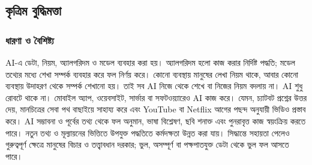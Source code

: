 \begin{topicbody}
\subsection{কৃত্রিম বুদ্ধিমত্তা}
\label{sec:ch1-ai}
\subsubsection{ধারণা ও বৈশিষ্ট্য}
AI-এ ডেটা, নিয়ম, অ্যালগরিদম ও মডেল ব্যবহার করা হয়। অ্যালগরিদম হলো কাজ করার নির্দিষ্ট পদ্ধতি; মডেল তথ্যের মধ্যে শেখা সম্পর্ক ব্যবহার করে ফল নির্ণয় করে। কোনো ব্যবস্থায় মানুষের লেখা নিয়ম থাকে, আবার কোনো ব্যবস্থায় উদাহরণ থেকে সম্পর্ক শেখানো হয়। তাই সব AI নিজে থেকে শেখে বা নিজের নিয়ম বদলায় না।
AI শুধু রোবটে থাকে না। মোবাইল অ্যাপ, ওয়েবসাইট, সার্ভার বা সফটওয়্যারেও AI কাজ করে। যেমন, চ্যাটবট প্রশ্নের উত্তর দেয়, মানচিত্রের সেবা পথ বাছাইয়ে সাহায্য করে এবং YouTube বা Netflix আগের পছন্দ অনুযায়ী ভিডিও প্রস্তাব করে।
AI সম্ভাবনা ও পূর্বের তথ্য থেকে ফল অনুমান, ভাষা বিশ্লেষণ, ছবি শনাক্ত এবং পুনরাবৃত্ত কাজ স্বয়ংক্রিয় করতে পারে। নতুন তথ্য ও মূল্যায়নের ভিত্তিতে উপযুক্ত পদ্ধতিতে কর্মদক্ষতা উন্নত করা যায়। সিদ্ধান্তে সহায়তা পেলেও গুরুত্বপূর্ণ ক্ষেত্রে মানুষের বিচার ও তত্ত্বাবধান দরকার; ভুল, অসম্পূর্ণ বা পক্ষপাতযুক্ত ডেটা থেকে ভুল ফল আসতে পারে।

\end{topicbody}
